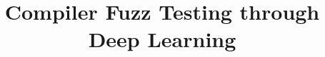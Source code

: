 



\title{Compiler Fuzz Testing through Deep Learning}
\maketitle














\printbibliography

